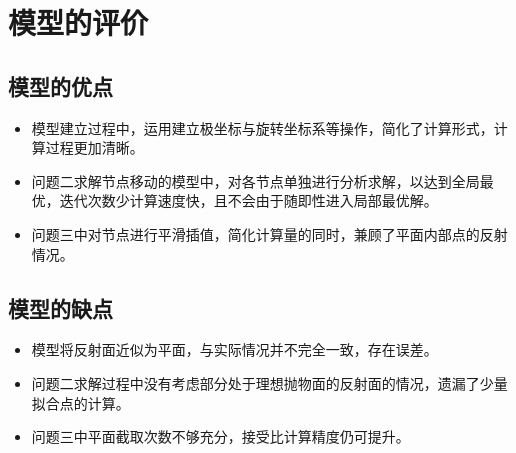 \documentclass[withoutpreface,bwprint]{cumcmthesis} %
\begin{document}
	
	
	\section{模型的评价}
\subsection{模型的优点}
\begin{itemize}
	\item 模型建立过程中，运用建立极坐标与旋转坐标系等操作，简化了计算形式，计算过程更加清晰。
	\item 问题二求解节点移动的模型中，对各节点单独进行分析求解，以达到全局最优，迭代次数少计算速度快，且不会由于随即性进入局部最优解。
	\item 问题三中对节点进行平滑插值，简化计算量的同时，兼顾了平面内部点的反射情况。
\end{itemize}
\subsection{模型的缺点}
\begin{itemize}
	\item 模型将反射面近似为平面，与实际情况并不完全一致，存在误差。
	\item 问题二求解过程中没有考虑部分处于理想抛物面的反射面的情况，遗漏了少量拟合点的计算。
	\item 问题三中平面截取次数不够充分，接受比计算精度仍可提升。
\end{itemize}
	
	
	\nocite{*}
	
	
	
\end{document}
